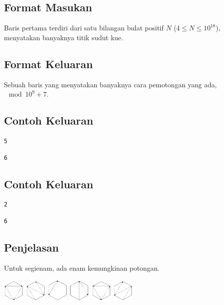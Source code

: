 \documentclass{article}
\begin{document}
\subsection*{Format Masukan}
Baris pertama terdiri dari satu bilangan bulat positif $N$ ($4 \leq N \leq 10^{18}$), menyatakan banyaknya titik sudut kue.

\subsection*{Format Keluaran}
Sebuah baris yang menyatakan banyaknya cara pemotongan yang ada, $\mod 10^9 + 7$.
\\

\begin{multicols}{2}
\subsection*{Contoh Keluaran}
\begin{lstlisting}
5
\end{lstlisting}
\begin{lstlisting}
6
\end{lstlisting}
\columnbreak
\subsection*{Contoh Keluaran}
\begin{lstlisting}
2
\end{lstlisting}
\begin{lstlisting}
6
\end{lstlisting}
\end{multicols}

\subsection*{Penjelasan}
Untuk segienam, ada enam kemungkinan potongan.

\includegraphics[width=40px]{1.png}
\includegraphics[width=40px]{2.png}
\includegraphics[width=40px]{3.png}
\includegraphics[width=40px]{4.png}
\includegraphics[width=40px]{5.png}
\includegraphics[width=40px]{6.png}


\pagebreak
\end{document}
